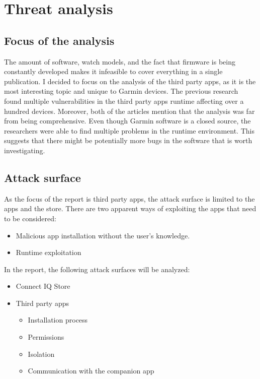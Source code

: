 \section{Threat analysis}
\subsection{Focus of the analysis}
The amount of software, watch models, and the fact that firmware is being constantly developed makes it infeasible to cover everything in a single publication.
I decided to focus on the analysis of the third party apps, as it is the most interesting topic and unique to Garmin devices.
The previous research found multiple vulnerabilities in the third party apps runtime affecting over a hundred devices\cite{broken-vm,compromising-garmin-watches}.
Moreover, both of the articles mention that the analysis was far from being comprehensive.
Even though Garmin software is a closed source, the researchers were able to find multiple problems in the runtime environment.
This suggests that there might be potentially more bugs in the software that is worth investigating.

\subsection{Attack surface}
As the focus of the report is third party apps, the attack surface is limited to the apps and the store.
There are two apparent ways of exploiting the apps that need to be considered:
\begin{itemize}
    \item Malicious app installation without the user's knowledge.

    \item Runtime exploitation
\end{itemize}

In the report, the following attack surfaces will be analyzed:

\begin{itemize}
    \item Connect IQ Store
    \item Third party apps
    \begin{itemize}
        \item Installation process
        \item Permissions
        \item Isolation
        \item Communication with the companion app
    \end{itemize}
\end{itemize}